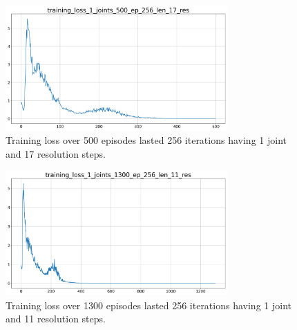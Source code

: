 \documentclass[twocolumn, a4paper]{article}
\begin{document}
\begin{figure}[H]
	\centering
	\includegraphics[width=8.5cm]{"../Figures/training_loss_1J_500E_256EL_17RES.png"}
	\caption{Training loss over 500 episodes lasted 256 iterations having 1
			 joint and 17 resolution steps.}
	\label{fig:TrainLoss_1_500_17}
\end{figure}
\vspace{-1cm}

\begin{figure}[H]
	\centering
	\includegraphics[width=8.5cm]{"../Figures/training_loss_1J_1300E_256EL_11RES.png"}
	\caption{Training loss over 1300 episodes lasted 256 iterations having 1
			 joint and 11 resolution steps.}
	\label{fig:TrainLoss_1_1300_11}
\end{figure}
\end{document}
